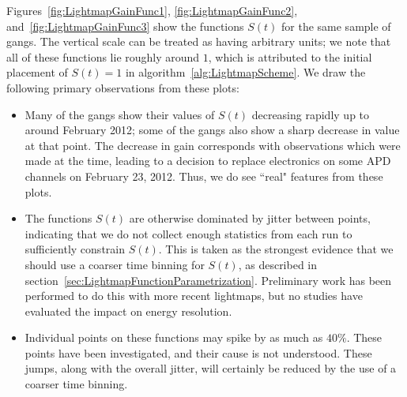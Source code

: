 Figures~\ref{fig:LightmapGainFunc1}, \ref{fig:LightmapGainFunc2}, and~\ref{fig:LightmapGainFunc3} show the functions $S(t)$ for the same sample of gangs.  The vertical scale can be treated as having arbitrary units; we note that all of these functions lie roughly around $1$, which is attributed to the initial placement of $S(t) = 1$ in algorithm~\ref{alg:LightmapScheme}.  We draw the following primary observations from these plots:
\begin{itemize}
\item Many of the gangs show their values of $S(t)$ decreasing rapidly up to around February 2012; some of the gangs also show a sharp decrease in value at that point.  The decrease in gain corresponds with observations which were made at the time, leading to a decision to replace electronics on some APD channels on February 23, 2012.  Thus, we do see ``real" features from these plots.
\item The functions $S(t)$ are otherwise dominated by jitter between points, indicating that we do not collect enough statistics from each run to sufficiently constrain $S(t)$.  This is taken as the strongest evidence that we should use a coarser time binning for $S(t)$, as described in section~\ref{sec:LightmapFunctionParametrization}.  Preliminary work has been performed to do this with more recent lightmaps, but no studies have evaluated the impact on energy resolution.
\item Individual points on these functions may spike by as much as $40\%$.  These points have been investigated, and their cause is not understood.  These jumps, along with the overall jitter, will certainly be reduced by the use of a coarser time binning.
\end{itemize}
